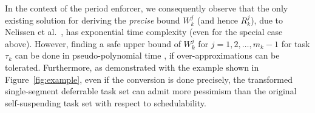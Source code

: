 In the context of the period enforcer, we consequently observe that the only existing solution for deriving the \emph{precise} bound $W_k^{j}$ (and hence $R_k^j$), due to Nelissen et al.\ \cite{ecrts15nelissen},  has exponential time complexity (even for the special case above).
However, finding a safe upper bound of $W_k^j$ for $j=1,2,\ldots,m_k-1$ for task $\tau_k$ can be done in pseudo-polynomial time \cite{PH:rtss98}, if over-approximations can be tolerated. 
Furthermore, as demonstrated with the example shown in Figure~\ref{fig:example}, even if the conversion is done precisely, the transformed single-segment deferrable task set can admit more pessimism than the original self-suspending task set with respect to schedulability.
